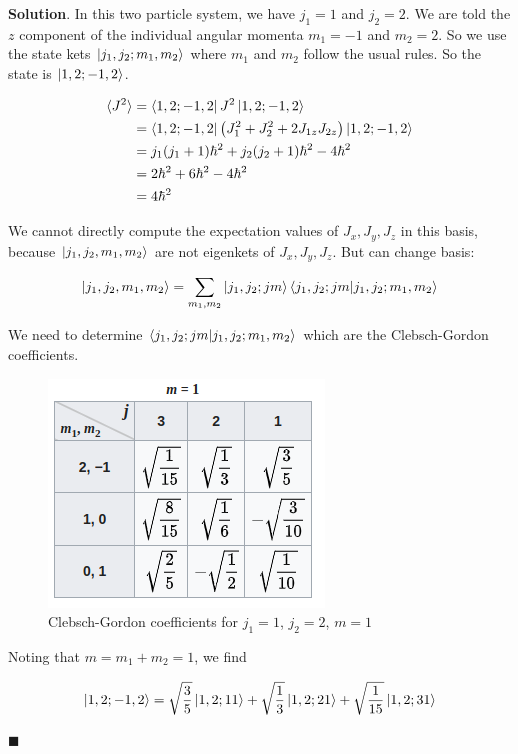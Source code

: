\documentclass[12pt]{article}
\theoremstyle{definition}
\newenvironment{s}{%
        \begin{trivlist} \item \textbf{Solution}. }{%
            \hspace*{\fill} $\blacksquare$\end{trivlist}}%
\begin{document}
{\begin{s}
In this two particle system, we have $j_{1} = 1$ and $j_{2} = 2$. We are told the $z$ component of the individual angular momenta $m_{1} = -1$ and $m_{2} = 2$. So we use the state kets $\ket{j_{1}, j_{2}; m_{1},m_{2}}$ where $m_1$ and $m_2$ follow the usual rules. So the state is $\ket{1,2;-1,2}$.

\begin{align*}
\langle J^{2} \rangle &= \bra{1,2;-1,2}J^{2}\ket{1,2;-1,2}\\
&= \bra{1,2;-1,2}\left(J_{1}^{2}+J_{2}^{2} + 2J_{1z}J_{2z}\right)\ket{1,2;-1,2}\\
&= j_{1}(j_{1}+1)\hbar^{2} + j_{2}(j_{2}+1)\hbar^{2} - 4\hbar^{2}\\
&= 2\hbar^{2} + 6\hbar^{2} - 4\hbar^{2}\\
&= 4\hbar^{2}
\end{align*}

We cannot directly compute the expectation values of $J_x, J_y, J_z$ in this basis, because $\ket{j_1, j_2, m_1, m_2}$ are not eigenkets of $J_x, J_y, J_z$. But can change basis:

\begin{align*}
\ket{j_1, j_2, m_1, m_2} = \sum_{m_1,m_2} \ket{j_1,j_2; jm}\bra{j_1,j_2; jm}\ket{j_{1}, j_{2}; m_{1},m_{2}}
\end{align*}

We need to determine $\bra{j_1,j_2; jm}\ket{j_{1}, j_{2}; m_{1},m_{2}}$ which are the Clebsch-Gordon coefficients.

\begin{figure}
\centering
\includegraphics[scale=0.75]{cb-table.png}
\caption{Clebsch-Gordon coefficients for $j_{1} = 1$, $j_{2} = 2$, $m=1$}
\end{figure}

Noting that $m = m_1 + m_2 = 1$, we find

\begin{align*}
\ket{1,2;-1,2} = \sqrt{\frac{3}{5}}\ket{1,2;1 1} + \sqrt{\frac{1}{3}}\ket{1,2;2 1} + \sqrt{\frac{1}{15}}\ket{1,2;3 1}
\end{align*}


\end{s}}
\end{document}
